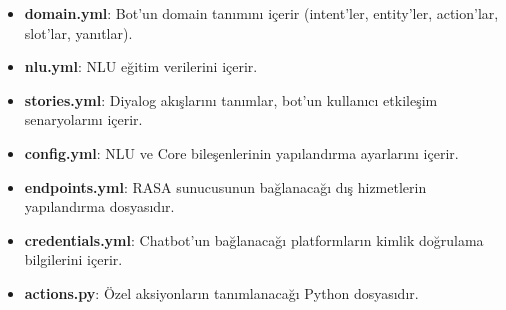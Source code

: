 \begin{itemize}
	\item \textbf{domain.yml}: Bot'un domain tanımını içerir (intent'ler, entity'ler, action'lar, slot'lar, yanıtlar).
	\item \textbf{nlu.yml}: NLU eğitim verilerini içerir.
	\item \textbf{stories.yml}: Diyalog akışlarını tanımlar, bot'un kullanıcı etkileşim senaryolarını içerir.
	\item \textbf{config.yml}: NLU ve Core bileşenlerinin yapılandırma ayarlarını içerir.
	\item \textbf{endpoints.yml}: RASA sunucusunun bağlanacağı dış hizmetlerin yapılandırma dosyasıdır.
	\item \textbf{credentials.yml}: Chatbot'un bağlanacağı platformların kimlik doğrulama bilgilerini içerir.
	\item \textbf{actions.py}: Özel aksiyonların tanımlanacağı Python dosyasıdır.
\end{itemize}

\newpage